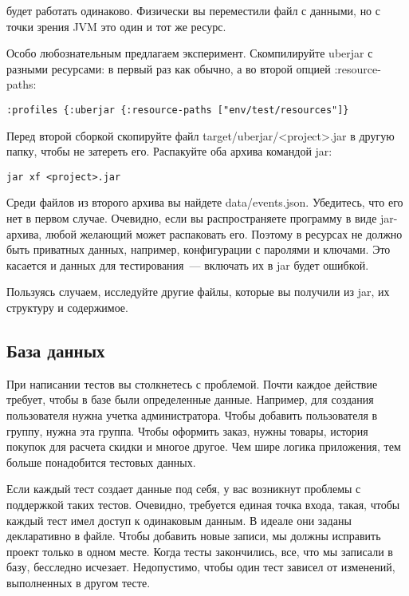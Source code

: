 будет работать одинаково. Физически вы переместили файл с данными, но с точки
зрения JVM это один и тот же ресурс.

Особо любознательным предлагаем эксперимент. Скомпилируйте uberjar с разными
ресурсами: в первый раз как обычно, а во второй опцией :resource-paths:

\begin{verbatim}
:profiles {:uberjar {:resource-paths ["env/test/resources"]}
\end{verbatim}

Перед второй сборкой скопируйте файл target/uberjar/<project>.jar в другую
папку, чтобы не затереть его. Распакуйте оба архива командой jar:

\begin{verbatim}
jar xf <project>.jar
\end{verbatim}

Среди файлов из второго архива вы найдете data/events.json. Убедитесь, что его
нет в первом случае. Очевидно, если вы распространяете программу в виде
jar-архива, любой желающий может распаковать его. Поэтому в ресурсах не должно
быть приватных данных, например, конфигурации с паролями и ключами. Это касается
и данных для тестирования~--- включать их в jar будет ошибкой.

Пользуясь случаем, исследуйте другие файлы, которые вы получили из jar, их
структуру и содержимое.

\subsection{База данных}

При написании тестов вы столкнетесь с проблемой. Почти каждое действие требует,
чтобы в базе были определенные данные. Например, для создания пользователя нужна
учетка администратора. Чтобы добавить пользователя в группу, нужна эта
группа. Чтобы оформить заказ, нужны товары, история покупок для расчета скидки и
многое другое. Чем шире логика приложения, тем больше понадобится тестовых
данных.

Если каждый тест создает данные под себя, у вас возникнут проблемы с поддержкой
таких тестов. Очевидно, требуется единая точка входа, такая, чтобы каждый тест
имел доступ к одинаковым данным. В идеале они заданы декларативно в файле. Чтобы
добавить новые записи, мы должны исправить проект только в одном месте. Когда
тесты закончились, все, что мы записали в базу, бесследно исчезает. Недопустимо,
чтобы один тест зависел от изменений, выполненных в другом тесте.


